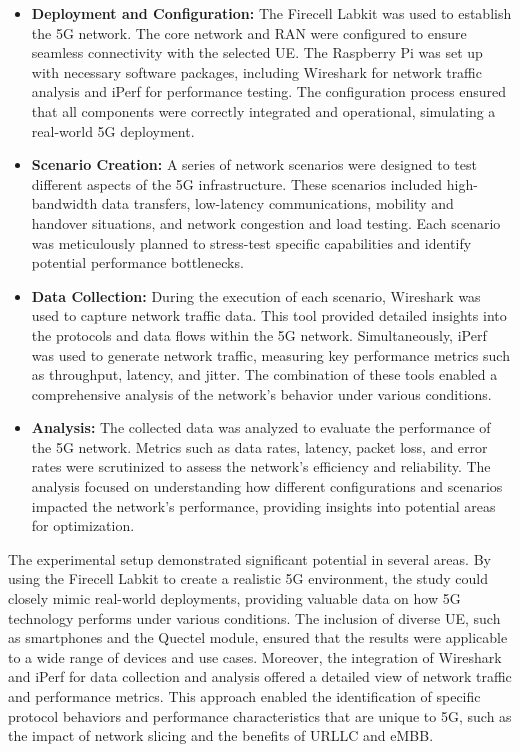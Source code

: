\documentclass{report}
\begin{document}
\begin{itemize}
	\item \textbf{Deployment and Configuration:} The Firecell Labkit was used to establish the 5G network. The core network and RAN were configured to ensure seamless connectivity with the selected UE. The Raspberry Pi was set up with necessary software packages, including Wireshark for network traffic analysis and iPerf for performance testing. The configuration process ensured that all components were correctly integrated and operational, simulating a real-world 5G deployment.
	\item \textbf{Scenario Creation:} A series of network scenarios were designed to test different aspects of the 5G infrastructure. These scenarios included high-bandwidth data transfers, low-latency communications, mobility and handover situations, and network congestion and load testing. Each scenario was meticulously planned to stress-test specific capabilities and identify potential performance bottlenecks.
	\item \textbf{Data Collection:} During the execution of each scenario, Wireshark was used to capture network traffic data. This tool provided detailed insights into the protocols and data flows within the 5G network. Simultaneously, iPerf was used to generate network traffic, measuring key performance metrics such as throughput, latency, and jitter. The combination of these tools enabled a comprehensive analysis of the network's behavior under various conditions.
	\item \textbf{Analysis:} The collected data was analyzed to evaluate the performance of the 5G network. Metrics such as data rates, latency, packet loss, and error rates were scrutinized to assess the network's efficiency and reliability. The analysis focused on understanding how different configurations and scenarios impacted the network's performance, providing insights into potential areas for optimization.
\end{itemize}
The experimental setup demonstrated significant potential in several areas. By using the Firecell Labkit to create a realistic 5G environment, the study could closely mimic real-world deployments, providing valuable data on how 5G technology performs under various conditions. The inclusion of diverse UE, such as smartphones and the Quectel module, ensured that the results were applicable to a wide range of devices and use cases. Moreover, the integration of Wireshark and iPerf for data collection and analysis offered a detailed view of network traffic and performance metrics. This approach enabled the identification of specific protocol behaviors and performance characteristics that are unique to 5G, such as the impact of network slicing and the benefits of URLLC and eMBB.\\
\end{document}
